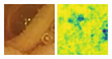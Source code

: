 \documentclass[conference]{IEEEtran}
\begin{document}
\begin{figure}[!t]
    \endminipage\hfill
        \centering
        \includegraphics[width=\linewidth]{Figures/520/520_Densenet.jpg}
        
        \vfill
        \includegraphics[width=\linewidth]{Figures/520/520_DenseNet__ssim.jpg}
        

\end{figure}
\end{document}
